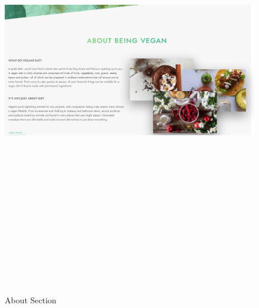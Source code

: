 \begin{figure}[!hb]
\centering
\caption[About Section]{About Section}%
\label{fig:about_section}
\includegraphics[width=\linewidth,height=20cm,keepaspectratio]{img/about_section}
\end{figure}

\clearpage

